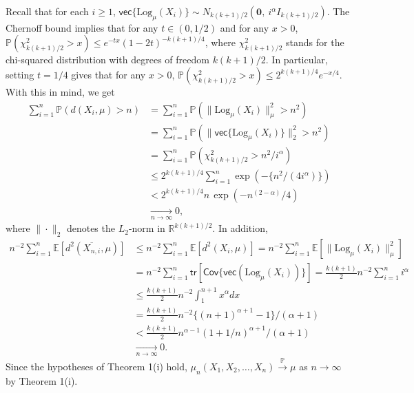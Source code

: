 \documentclass[preprint]{imsart}
\theoremstyle{plain}
\theoremstyle{remark}
\begin{document}
\begin{appendix}
%
Recall that for each $i\ge 1$, $\textsf{vec}\{\mbox{Log}_{\mu}(X_i)\} \sim N_{k(k+1)/2}(\textbf{0}, ~i^{\alpha}I_{k(k+1)/2})$. 
The Chernoff bound implies that for any $t \in (0, 1/2)$ and for any $x>0$, $\mathbb{P}(\chi^2_{k(k+1)/2} > x) \le e^{-tx}(1-2t)^{-k(k+1)/4}$, where $\chi^2_{k(k+1)/2}$ stands for the chi-squared distribution with degrees of freedom $k(k+1)/2$. In particular, setting $t=1/4$ gives that for any $x > 0$, $\mathbb{P}(\chi^2_{k(k+1)/2} > x) \le 2^{k(k+1)/4}e^{-x/4}$. With this in mind, we get
\begin{align*}
\sum_{i=1}^{n}\mathbb{P}(d(X_i, \mu) > n)&= \sum_{i=1}^{n}\mathbb{P}(\|\mbox{Log}_{\mu}(X_i)\|_{\mu}^2 > n^2) \\
&= \sum_{i=1}^{n}\mathbb{P}(\|\textsf{vec}\{\mbox{Log}_{\mu}(X_i)\}\|_{2}^2 > n^2) \\
&= \sum_{i=1}^{n}\mathbb{P}(\chi^2_{k(k+1)/2}>n^2/i^\alpha) \\
&\le 2^{k(k+1)/4}\sum_{i=1}^{n}\exp(-\{n^2/(4i^\alpha)\}) \\
& < 2^{k(k+1)/4}n\,\exp(-n^{(2-\alpha)}/4) \\
& \underset{n \to \infty}{\to} 0,
\end{align*}
where $\|\cdot \|_{2}$ denotes the $L_2$-norm in $\mathbb{R}^{k(k+1)/2}$. In addition, 
\begin{align*}
n^{-2}\sum_{i=1}^{n}\mathbb{E}[d^2(\overline{X_{n,i}},\mu)] 
&\le n^{-2}\sum_{i=1}^{n}\mathbb{E}[d^2(X_i,\mu)] = n^{-2}\sum_{i=1}^{n}\mathbb{E}[\|\mbox{Log}_{\mu}(X_i)\|_{\mu}^2] \\
&=n^{-2}\sum_{i=1}^{n}\textsf{tr}[\textsf{Cov}\{\textsf{vec}(\mbox{Log}_{\mu}(X_i))\}] = \frac{k(k+1)}{2}n^{-2}\sum_{i=1}^{n}i^\alpha \\
&\le \frac{k(k+1)}{2} n^{-2}\int_{1}^{n+1}x^\alpha dx \\
&= \frac{k(k+1)}{2}n^{-2}\{(n+1)^{\alpha+1} -1\}/(\alpha+1) \\
&< \frac{k(k+1)}{2}n^{\alpha-1}(1+ 1/n)^{\alpha + 1}/(\alpha+1) \\
&\underset{n \to \infty}{\to} 0.
\end{align*}
Since the hypotheses of Theorem 1(i) hold, $\mu_n(X_1, X_2, \ldots , X_n) \overset{\mathbb{P}}{\to} \mu$ as $n\to \infty$ by Theorem 1(i). 







\end{appendix}
\end{document}
